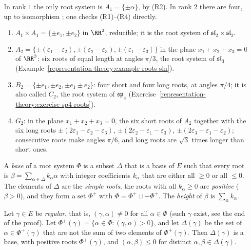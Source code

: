 \begin{example}\label{representation-theory:example-rank-two}
In rank $1$ the only root system is $A_1 = \{\pm\alpha\}$, by (R2). In rank $2$ there are four, up to isomorphism \cite[Section 9.3]{humphreys-lie}; one checks (R1)--(R4) directly.
\begin{enumerate}
\item $A_1 \times A_1 = \{\pm e_1, \pm e_2\}$ in $\RR^2$, reducible; it is the root system of $\mathfrak{sl}_2 \times \mathfrak{sl}_2$.
\item $A_2 = \{\pm(\varepsilon_1 - \varepsilon_2), \pm(\varepsilon_2 - \varepsilon_3), \pm(\varepsilon_1 - \varepsilon_3)\}$ in the plane $x_1 + x_2 + x_3 = 0$ of $\RR^3$: six roots of
equal length at angles $\pi/3$, the root system of $\mathfrak{sl}_3$ (Example~\ref{representation-theory:example-roots-sln}).
\item $B_2 = \{\pm e_1, \pm e_2, \pm e_1 \pm e_2\}$: four short and four long roots, at angles $\pi/4$; it is also called $C_2$, the root system of $\mathfrak{sp}_4$
(Exercise~\ref{representation-theory:exercise-sp4-roots}).
\item $G_2$: in the plane $x_1 + x_2 + x_3 = 0$, the six short roots of $A_2$ together with the six long roots $\pm(2\varepsilon_1 - \varepsilon_2 - \varepsilon_3)$,
$\pm(2\varepsilon_2 - \varepsilon_1 - \varepsilon_3)$, $\pm(2\varepsilon_3 - \varepsilon_1 - \varepsilon_2)$; consecutive roots make angles $\pi/6$, and long roots are $\sqrt3$ times
longer than short ones.
\end{enumerate}
\end{example}

\begin{definition}\label{representation-theory:definition-base}
A \emph{base} of a root system $\Phi$ is a subset $\Delta$ that is a basis of $E$ such that every root is $\beta = \sum_{\alpha \in \Delta}k_\alpha\alpha$ with integer coefficients $k_\alpha$
that are either all $\geq 0$ or all $\leq 0$. The elements of $\Delta$ are the \emph{simple roots}, the roots with all $k_\alpha \geq 0$ are \emph{positive} ($\beta > 0$), and they form a
set $\Phi^+$ with $\Phi = \Phi^+ \sqcup -\Phi^+$. The \emph{height} of $\beta$ is $\sum_\alpha k_\alpha$.
\end{definition}

\begin{theorem}\label{representation-theory:theorem-bases-exist}
Let $\gamma \in E$ be \emph{regular}, that is, $(\gamma, \alpha) \neq 0$ for all $\alpha \in \Phi$ (such $\gamma$ exist, see the end of the proof). Let
$\Phi^+(\gamma) = \{\alpha \in \Phi : (\gamma, \alpha) > 0\}$, and let $\Delta(\gamma)$ be the set of $\alpha \in \Phi^+(\gamma)$ that are not the sum of two elements of
$\Phi^+(\gamma)$. Then $\Delta(\gamma)$ is a base, with positive roots $\Phi^+(\gamma)$, and $(\alpha, \beta) \leq 0$ for distinct $\alpha, \beta \in \Delta(\gamma)$.
\end{theorem}

